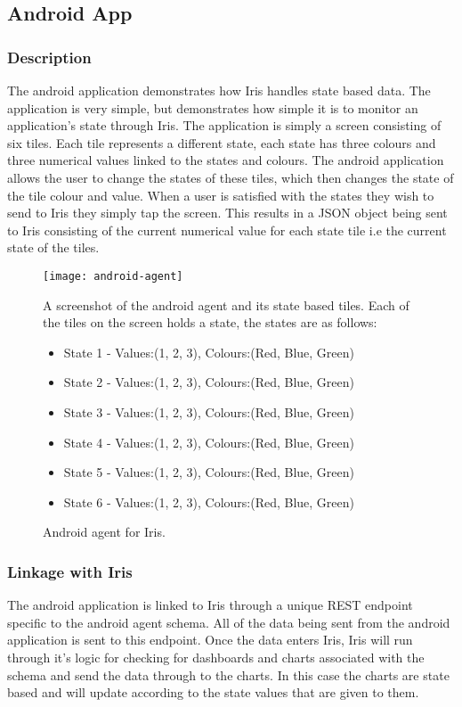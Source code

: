 \documentclass[12pt,a4paper,titlepage]{report}
\begin{document}
\subsection{Android App}
\subsubsection{Description}
The android application demonstrates how Iris handles state based data. The application is very simple, but demonstrates how simple it is to monitor an application's state through Iris. The application is simply a screen consisting of six tiles. Each tile represents a different state, each state has three colours and three numerical values linked to the states and colours. The android application allows the user to change the states of these tiles, which then changes the state of the tile colour and value. When a user is satisfied with the states they wish to send to Iris they simply tap the screen. This results in a JSON object being sent to Iris consisting of the current numerical value for each state tile i.e the current state of the tiles.
\begin{figure}[H]
\begin{tcolorbox}
\begin{center}
\texttt{[image: android-agent]}
\end{center}
A screenshot of the android agent and its state based tiles. Each of the tiles on the screen holds a state, the states are as follows:
\begin{itemize}
    \item State 1 - Values:(1, 2, 3), Colours:(Red, Blue, Green)
    \item State 2 - Values:(1, 2, 3), Colours:(Red, Blue, Green) 
    \item State 3 - Values:(1, 2, 3), Colours:(Red, Blue, Green) 
    \item State 4 - Values:(1, 2, 3), Colours:(Red, Blue, Green) 
    \item State 5 - Values:(1, 2, 3), Colours:(Red, Blue, Green) 
    \item State 6 - Values:(1, 2, 3), Colours:(Red, Blue, Green) 
\end{itemize}
\end{tcolorbox}
\caption{Android agent for Iris.}
\end{figure}

\subsubsection{Linkage with Iris}
The android application is linked to Iris through a unique REST endpoint specific to the android agent schema. All of the data being sent from the android application is sent to this endpoint. Once the data enters Iris, Iris will run through it's logic for checking for dashboards and charts associated with the schema and send the data through to the charts. 
In this case the charts are state based and will update according to the state values that are given to them.
\end{document}
